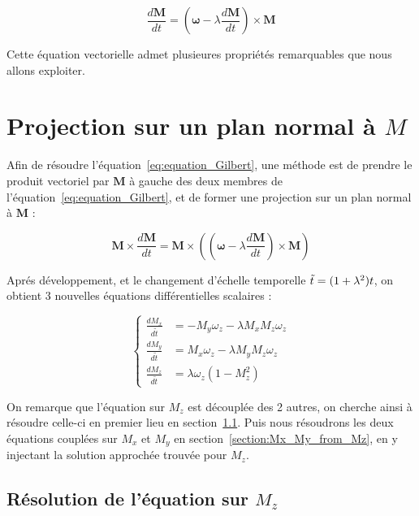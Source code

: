 \documentclass[12pt]{report}
\begin{document}
\begin{equation}
    \frac{d\bm{M}}{dt} = (\bm{\omega}-\lambda \frac{d{\bm{M}}}{dt})\times\bm{M}
    \label{eq:equation_Gilbert}
\end{equation}

Cette équation vectorielle admet plusieures propriétés remarquables que nous allons exploiter.

\section{Projection sur un plan normal à $M$}
\label{sec:projection_plan_normal}

Afin de résoudre l'équation~\ref{eq:equation_Gilbert}, une méthode est de prendre le produit vectoriel par $\bm M$ à gauche des deux membres de l'équation~\ref{eq:equation_Gilbert}, et de former une projection sur un plan normal à $\bm{M}$ :

\begin{equation}
    \bm{M}\times\frac{d\bm{M}}{dt} = \bm{M}\times((\bm{\omega}-\lambda \frac{d{\bm{M}}}{dt})\times\bm{M} )
    \label{eq:equation_Gilbert_produit_vectoriel}
\end{equation}

Aprés développement, et le changement d'échelle temporelle $\Tilde{t} = (1+\lambda^2)t$, on obtient 3 nouvelles équations différentielles scalaires :

\begin{equation}
    \left\{
    \begin{aligned}
        \frac{dM_x}{d\tilde{t}} & = - M_y\omega_z - \lambda M_x M_z \omega_z \\
        \frac{dM_y}{d\tilde{t}} & = M_x\omega_z - \lambda M_y M_z \omega_z   \\
        \frac{dM_z}{d\tilde{t}} & = \lambda\omega_z (1-M_z^2)
    \end{aligned}
    \right.
    \label{eq:equations_scalaires_Gilbert}
\end{equation}

On remarque que l'équation sur $M_z$ est découplée des 2 autres, on cherche ainsi à résoudre celle-ci en premier lieu en section~\ref{section:Mz}. Puis nous résoudrons les deux équations couplées sur $M_x$ et $M_y$ en section~\ref{section:Mx_My_from_Mz}, en y injectant la solution approchée trouvée pour $M_z$.

\subsection{Résolution de l'équation sur $M_z$}
\label{section:Mz}
\end{document}
